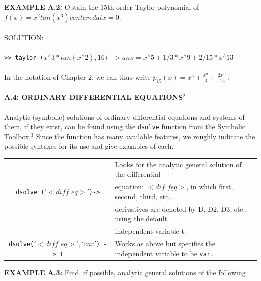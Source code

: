 \documentclass[../main.tex]{subfiles}
\begin{document}
\textbf{EXAMPLE A.2:} Obtain the 15th-order Taylor polynomial of $f(x) = x^2
 tan(x^3) centered at x = 0. $\\
 \\
SOLUTION:\\
\\
\texttt{>> taylor ($x^{\wedge}3*tan(x^{\wedge}2),16) -> ans =x^{\wedge}5+1/3*x^{\wedge}9+2/15*x^{\wedge}13$}\\
\\
In the notation of Chapter 2, we can thus write $p_{15}(x)=x^{5}+\frac{x^{9}}{3}+\frac{2 x^{13}}{15}$.
\\
\\
\textbf{A.4: ORDINARY DIFFERENTIAL EQUATIONS$^{2}$ }
\\
\\
Analytic (symbolic) solutions of ordinary differential equations and systems of 
them, if they exist, can be found using the \texttt{dsolve} function from the Symbolic 
Toolbox.$^3$
 Since the function has many available features, we roughly indicate the 
possible syntaxes for its use and give examples of each. 
\begin{center}
\begin{tabular}{|c|l|}
\hline
&Looks for the analytic general solution of the differential \\
\texttt{dsolve ($'<diff\_eq> ' $)->}&equation: \texttt{$<dif\_f\underline eq>$}, in which first, second, third, etc.\\
&derivatives are denoted by D, D2, D3, etc., using the default\\
&independent variable t. \\
\hline
\texttt{dsolve($'<diff \_ eq>','var'$) -> )}&Works as above but specifies the independent variable to be \texttt{var. }\\
\hline
\end{tabular}
\end{center}
\textbf{EXAMPLE A.3:} Find, if possible, analytic general solutions of the following 
\end{document}
